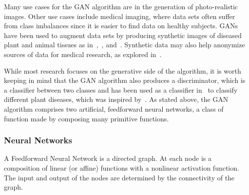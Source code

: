 Many use cases for the GAN algorithm are in the generation of
photo-realistic images.  Other use cases include medical imaging,
where data sets often suffer from class imbalances since it is easier
to find data on healthy subjects.  GANs have been used to augment data
sets by producing synthetic images of diseased plant and animal
tissues as in~\cite{ref:nazki-2018},~\cite{ref:valerio-2017},
and~\cite{ref:frid-2018}. Synthetic data may also help anonymize
sources of data for medical research, as explored
in~\cite{ref:shin-2018}.

While most research focuses on the generative side of the algorithm,
it is worth keeping in mind that the GAN algorithm also produces a
discriminator, which is a classifier between two classes and has been
used as a classifier in~\cite{ref:cortes-2017} to classify different
plant diseases, which was inspired by~\cite{ref:odena-2016}.  As
stated above, the GAN algorithm comprises two artificial, feedforward
neural networks, a class of function made by composing many primitive
functions.

\subsubsection*{Neural Networks}

\begin{definition}
  A \textnormal{\sffamily Feedforward Neural Network} is a directed
  graph. At each node is a composition of linear (or affine) functions
  with a nonlinear activation function. The input and output of the
  nodes are determined by the connectivity of the graph.
\end{definition}

